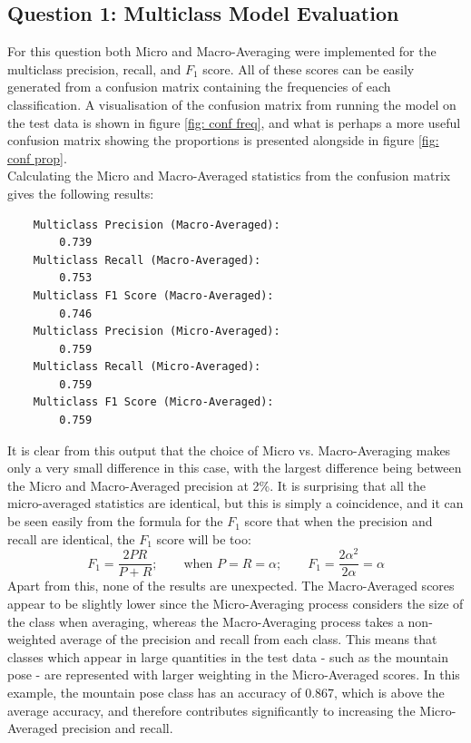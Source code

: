 \documentclass{article}
\begin{document}
\subsection*{Question 1: Multiclass Model Evaluation}
For this question both Micro and Macro-Averaging were implemented for the multiclass precision, recall, and $F_{1}$ score. All of these scores can be easily generated from a confusion matrix containing the frequencies of each classification. A visualisation of the confusion matrix from running the model on the test data is shown in figure \ref{fig: conf freq}, and what is perhaps a more useful confusion matrix showing the proportions is presented alongside in figure \ref{fig: conf prop}.\\[2mm]
Calculating the Micro and Macro-Averaged statistics from the confusion matrix gives the following results:
\begin{verbatim}
    Multiclass Precision (Macro-Averaged):
        0.739
    Multiclass Recall (Macro-Averaged):
        0.753
    Multiclass F1 Score (Macro-Averaged):
        0.746
    Multiclass Precision (Micro-Averaged):
        0.759
    Multiclass Recall (Micro-Averaged):
        0.759
    Multiclass F1 Score (Micro-Averaged):
        0.759
\end{verbatim}
It is clear from this output that the choice of Micro vs. Macro-Averaging makes only a very small difference in this case, with the largest difference being between the Micro and Macro-Averaged precision at 2\%. It is surprising that all the micro-averaged statistics are identical, but this is simply a coincidence, and it can be seen easily from the formula for the $F_{1}$ score that when the precision and recall are identical, the $F_{1}$ score will be too:
$$F_{1} = \frac{2PR}{P + R}; \qquad \mbox{when } P = R = \alpha; \qquad F_{1} = \frac{2 \alpha^{2}}{2 \alpha} = \alpha$$ 
Apart from this, none of the results are unexpected. The Macro-Averaged scores appear to be slightly lower since the Micro-Averaging process considers the size of the class when averaging, whereas the Macro-Averaging process takes a non-weighted average of the precision and recall from each class. This means that classes which appear in large quantities in the test data - such as the mountain pose - are represented with larger weighting in the Micro-Averaged scores. In this example, the mountain pose class has an accuracy of 0.867, which is above the average accuracy, and therefore contributes significantly to increasing the Micro-Averaged precision and recall.
\end{document}
